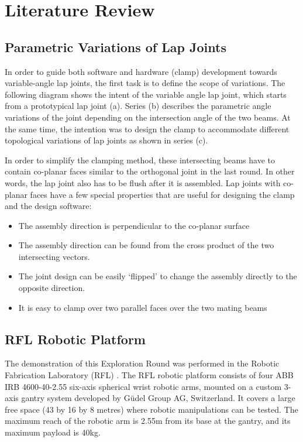 \section{Literature Review}
\label{section:exploration-2-literature-review}

\subsection{Parametric Variations of Lap Joints}
\label{subsection:exploration-2-parametric-variations-of-lap-joints}

In order to guide both software and hardware (clamp) development towards variable-angle lap joints, the first task is to define the scope of variations. The following diagram shows the intent of the variable angle lap joint, which starts from a prototypical lap joint (a). Series (b) describes the parametric angle variations of the joint depending on the intersection angle of the two beams. At the same time, the intention was to design the clamp to accommodate different topological variations of lap joints as shown in series (c).

In order to simplify the clamping method, these intersecting beams have to contain co-planar faces similar to the orthogonal joint in the last round. In other words, the lap joint also has to be flush after it is assembled. Lap joints with co-planar faces have a few special properties that are useful for designing the clamp and the design software:

\begin{itemize}
    \item The assembly direction is perpendicular to the co-planar surface
    \item The assembly direction can be found from the cross product of the two intersecting vectors.
    \item The joint design can be easily ‘flipped’ to change the assembly directly to the opposite direction.
    \item It is easy to clamp over two parallel faces over the two mating beams
\end{itemize}

\subsection{RFL Robotic Platform}
\label{subsection:exploration-2-rfl-robotic-platform}

The demonstration of this Exploration Round was performed in the Robotic Fabrication Laboratory (RFL) . The RFL robotic platform consists of four ABB IRB 4600-40-2.55 six-axis spherical wrist robotic arms, mounted on a custom 3-axis gantry system developed by Güdel Group AG, Switzerland. It covers a large free space (43 by 16 by 8 metres) where robotic manipulations can be tested. The maximum reach of the robotic arm is 2.55m from its base at the gantry, and its maximum payload is 40kg.

